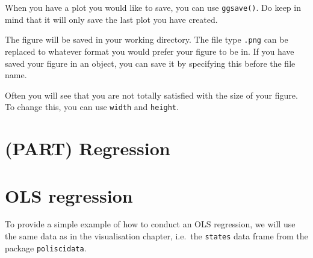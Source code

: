 \documentclass[12pt,oneside]{reedthesis}
\theoremstyle{definition}
\theoremstyle{definition}
\theoremstyle{definition}
\theoremstyle{remark}
\begin{document}
  When you have a plot you would like to save, you can use
  \texttt{ggsave()}. Do keep in mind that it will only save the last plot
  you have created.
  \begin{Shaded}
  \begin{Highlighting}[]
  \NormalTok{(}\NormalTok{)}
  \end{Highlighting}
  \end{Shaded}
  The figure will be saved in your working directory. The file type
  \texttt{.png} can be replaced to whatever format you would prefer your
  figure to be in. If you have saved your figure in an object, you can
  save it by specifying this before the file name.
  \begin{Shaded}
  \begin{Highlighting}[]
  \NormalTok{)}
  \end{Highlighting}
  \end{Shaded}
  Often you will see that you are not totally satisfied with the size of
  your figure. To change this, you can use \texttt{width} and
  \texttt{height}.
  \begin{Shaded}
  \begin{Highlighting}[]
  \NormalTok{, } \NormalTok{, } \NormalTok{)}
  \end{Highlighting}
  \end{Shaded}
  \chapter*{(PART) Regression}\label{part-regression}
  
  \chapter{OLS regression}\label{olsreg}
  
  To provide a simple example of how to conduct an OLS regression, we will
  use the same data as in the visualisation chapter, i.e.~the
  \texttt{states} data frame from the package \texttt{poliscidata}.
  \begin{Shaded}
  \begin{Highlighting}[]
  \NormalTok{(}\NormalTok{)}
  
  \StringTok{ }
  \end{Highlighting}
  \end{Shaded}
\end{document}
